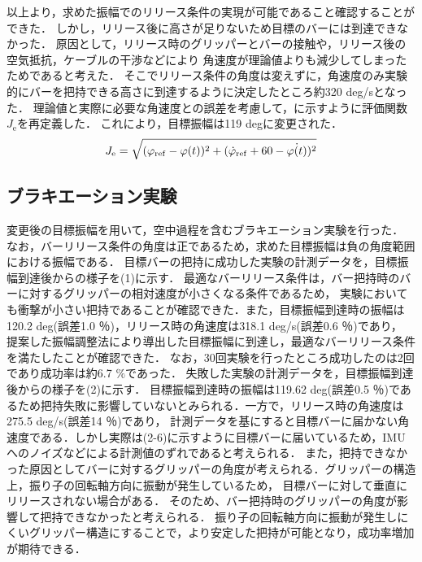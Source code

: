           以上より，求めた振幅でのリリース条件の実現が可能であること確認することができた．
          しかし，リリース後に高さが足りないため目標のバーには到達できなかった．
          原因として，リリース時のグリッパーとバーの接触や，リリース後の空気抵抗，ケーブルの干渉などにより
          角速度が理論値よりも減少してしまったためであると考えた．
          そこでリリース条件の角度は変えずに，角速度のみ実験的にバーを把持できる高さに到達するように決定したところ約320 deg/sとなった．
          理論値と実際に必要な角速度との誤差を考慮して，に示すように評価関数$J_{\mathrm{e}}$を再定義した．
          これにより，目標振幅は119 degに変更された．
          \begin{eqnarray}
            \equlabel{error2}
            J_{\mathrm{e}}=\sqrt{(\varphi_{\mathrm{ref}}-\varphi(t))^2+(\dot{\varphi}_{\mathrm{ref}}+60-\dot{\varphi(t)})^2}
          \end{eqnarray}
          
          \subsection{ブラキエーション実験}
          変更後の目標振幅を用いて，空中過程を含むブラキエーション実験を行った．
          なお，バーリリース条件の角度は正であるため，求めた目標振幅は負の角度範囲における振幅である．
          目標バーの把持に成功した実験の計測データを，目標振幅到達後からの様子を(1)に示す．
          最適なバーリリース条件は，バー把持時のバーに対するグリッパーの相対速度が小さくなる条件であるため，
          実験においても衝撃が小さい把持であることが確認できた．また，目標振幅到達時の振幅は120.2 deg(誤差1.0 ％)，リリース時の角速度は318.1 deg/s(誤差0.6 ％)であり，
          提案した振幅調整法により導出した目標振幅に到達し，最適なバーリリース条件を満たしたことが確認できた．
          なお，30回実験を行ったところ成功したのは2回であり成功率は約6.7 $\%$であった．
          失敗した実験の計測データを，目標振幅到達後からの様子を(2)に示す．
          目標振幅到達時の振幅は119.62 deg(誤差0.5 ％)であるため把持失敗に影響していないとみられる．一方で，リリース時の角速度は275.5 deg/s(誤差14 ％)であり，
          計測データを基にすると目標バーに届かない角速度である．しかし実際は(2-6)に示すように目標バーに届いているため，IMUへのノイズなどによる計測値のずれであると考えられる．
          また，把持できなかった原因としてバーに対するグリッパーの角度が考えられる．グリッパーの構造上，振り子の回転軸方向に振動が発生しているため，
          目標バーに対して垂直にリリースされない場合がある．
          そのため、バー把持時のグリッパーの角度が影響して把持できなかったと考えられる．
          振り子の回転軸方向に振動が発生しにくいグリッパー構造にすることで，より安定した把持が可能となり，成功率増加が期待できる．
          
